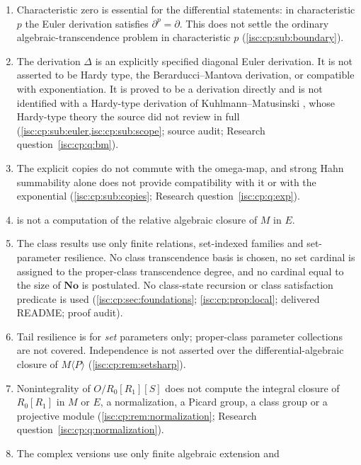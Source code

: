 \documentclass[11pt,letterpaper]{article}
\theoremstyle{definition}
\theoremstyle{remark}
\newcommand{\No}{\mathbf{No}}
\newcommand{\cc}{\mathfrak c}
\numberwithin{equation}{section}
\begin{document}
\begin{enumerate}[label=C\arabic*.,leftmargin=2.6em,itemsep=2pt]
or to $|k|>\cc$ with small positive transcendence degree, where only the
explicit lower bounds are claimed; the rapid-degree family need not reach
the cardinality of the Laurent field for large $k$
(\cref{isc:cp:sub:boundary}; Research questions~\ref{isc:cp:q:large}
and~\ref{isc:cp:q:algebraic}).
\item Characteristic zero is essential for the differential statements: in
characteristic $p$ the Euler derivation satisfies $\partial^p=\partial$. This
does not settle the ordinary algebraic-transcendence problem in
characteristic $p$ (\cref{isc:cp:sub:boundary}).
\item The derivation $\Delta$ is an explicitly specified diagonal Euler
derivation. It is not asserted to be Hardy type, the Berarducci--Mantova
derivation, or compatible with exponentiation. It is proved to be a
derivation directly and is not identified with a Hardy-type derivation of
Kuhlmann--Matusinski \cite{KM}, whose Hardy-type theory the source did not
review in full (\cref{isc:cp:sub:euler,isc:cp:sub:scope}; source audit;
Research question~\ref{isc:cp:q:bm}).
\item The explicit copies do not commute with the omega-map, and strong
Hahn summability alone does not provide compatibility with it or with the
exponential (\cref{isc:cp:sub:copies}; Research question~\ref{isc:cp:q:exp}).
\item {} is not a computation of the relative
algebraic closure of $M$ in $E$.
\item The class results use only finite relations, set-indexed families and
set-parameter resilience. No class transcendence basis is chosen, no set
cardinal is assigned to the proper-class transcendence degree, and no
cardinal equal to the size of $\No$ is postulated. No class-state recursion
or class satisfaction predicate is used (\cref{isc:cp:sec:foundations};
\cref{isc:cp:prop:local}; delivered README; proof audit).
\item Tail resilience is for \emph{set} parameters only; proper-class
parameter collections are not covered. Independence is not asserted over
the differential-algebraic closure of $M\langle P\rangle$
(\cref{isc:cp:rem:setsharp}).
\item Nonintegrality of $O/R_0[R_1][S]$ does not compute the integral
closure of $R_0[R_1]$ in $M$ or $E$, a normalization, a Picard group, a
class group or a projective module (\cref{isc:cp:rem:normalization};
Research question~\ref{isc:cp:q:normalization}).
\item The complex versions use only finite algebraic extension and

\end{enumerate}
\end{document}
